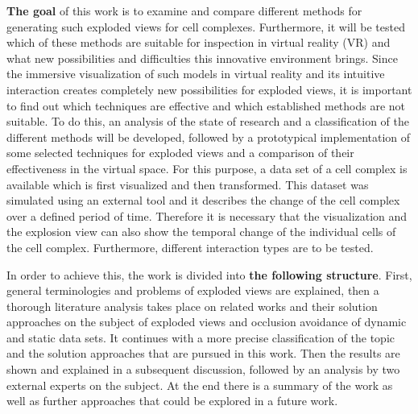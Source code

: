 \textbf{The goal} of this work is to examine and compare different methods for generating such exploded views for cell complexes. Furthermore, it will be tested which of these methods are suitable for inspection in virtual reality (VR) and what new possibilities and difficulties this innovative environment brings.
Since the immersive visualization of such models in virtual reality and its intuitive interaction creates completely new possibilities for exploded views, it is important to find out which techniques are effective and which established methods are not suitable.
To do this, an analysis of the state of research and a classification of the different methods will be developed, followed by a prototypical implementation of some selected techniques for exploded views and a comparison of their effectiveness in the virtual space.
For this purpose, a data set of a cell complex is available which is first visualized and then transformed. 
This dataset was simulated using an external tool and it describes the change of the cell complex over a defined period of time. 
Therefore it is necessary that the visualization and the explosion view can also show the temporal change of the individual cells of the cell complex.
Furthermore, different interaction types are to be tested. 

In order to achieve this, the work is divided into \textbf{the following structure}. 
First, general terminologies and problems of exploded views are explained, then a thorough literature analysis takes place on related works and their solution approaches on the subject of exploded views and occlusion avoidance of dynamic and static data sets.
It continues with a more precise classification of the topic and the solution approaches that are pursued in this work. 
Then the results are shown and explained in a subsequent discussion, followed by an analysis by two external experts on the subject. At the end there is a summary of the work as well as further approaches that could be explored in a future work.

